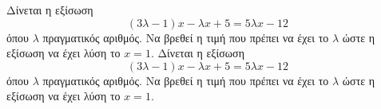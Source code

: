 Δίνεται η εξίσωση \[ (3\lambda-1)x-\lambda x+5=5\lambda x-12 \]
όπου $ \lambda $ πραγματικός αριθμός. Να βρεθεί η τιμή που πρέπει να έχει το $ \lambda $ ώστε η εξίσωση να έχει λύση το $ x=1 $.
Δίνεται η εξίσωση \[ (3\lambda-1)x-\lambda x+5=5\lambda x-12 \]
όπου $ \lambda $ πραγματικός αριθμός. Να βρεθεί η τιμή που πρέπει να έχει το $ \lambda $ ώστε η εξίσωση να έχει λύση το $ x=1 $.
